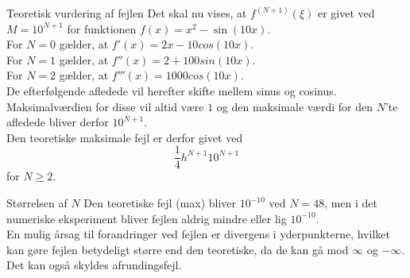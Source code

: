 \begin{frame}{Teoretisk vurdering af fejlen}
Det skal nu vises, at $f^{(N+1)}(\xi)$ er givet ved $M=10^{N+1}$ for funktionen $f(x)=x^2-\sin(10x).$ \\
  For $N=0$ gælder, at $f'(x)=2x-10cos(10x)$.\\
  For $N=1$ gælder, at $f''(x)=2+100sin(10x)$.\\
  For $N=2$ gælder, at $f'''(x)=1000cos(10x)$.\\
  De efterfølgende afledede vil herefter skifte mellem sinus og cosinus.
  Maksimalværdien for disse vil altid være $1$ og den maksimale værdi for den $N$'te afledede bliver derfor $10^{N+1}$. 
\\
  Den teoretiske maksimale fejl er derfor givet ved
  $$\frac{1}{4}h^{N+1}10^{N+1}$$ for $N \geq 2$. 
\end{frame}
\begin{frame}{Størrelsen af $N$}
    Den teoretiske fejl (max) bliver $10^{-10}$ ved $N=48$, men i det numeriske eksperiment bliver fejlen aldrig mindre eller lig $10^{-10}$. \\ 
    En mulig årsag til forandringer ved fejlen er divergens i yderpunkterne, hvilket kan gøre fejlen betydeligt større end den teoretiske, da de kan gå mod $ \infty $ og $ - \infty $. Det kan også skyldes afrundingsfejl. 
  
\end{frame}